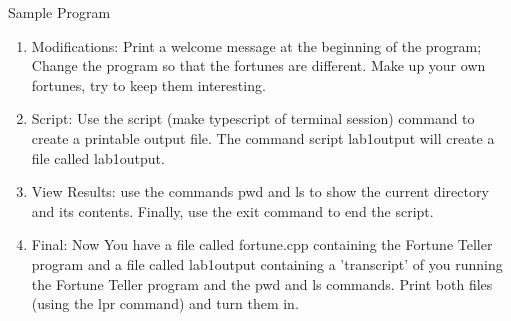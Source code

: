 \documentclass[presentation]{beamer}
\begin{document}
\begin{frame}[label=sec-6]{Sample Program}
\begin{enumerate}
\item Modifications: Print a \alert{welcome message} at the beginning of the program; Change the program so that the fortunes are \alert{different}. \alert{Make up your own fortunes}, try to keep them interesting.
\item Script: Use the \alert{script} (make typescript of terminal session) command to create a printable output file. The command \alert{script lab1output} will create a file called \alert{lab1output}.
\item View Results: use the commands \alert{pwd} and \alert{ls} to show the current directory and its contents. Finally, use the \alert{exit} command to end the script.
\item Final: Now You have a file called \alert{fortune.cpp} containing the Fortune Teller program and a file called \alert{lab1output} containing a 'transcript' of you running the Fortune Teller program and the pwd and ls commands. Print both files (using the \alert{lpr} command) and turn them in.
\end{enumerate}
\end{frame}
\end{document}
